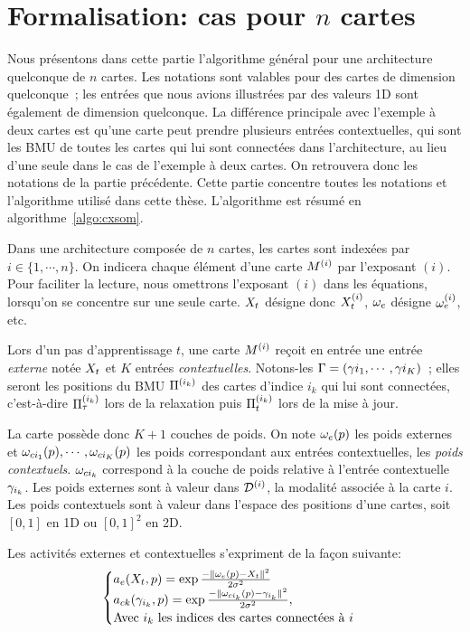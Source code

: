 \documentclass[../main]{subfiles}
\begin{document}
\section{Formalisation: cas pour $n$ cartes}\label{sec:formalisme}

Nous présentons dans cette partie l'algorithme général pour une architecture quelconque de $n$ cartes. 
Les notations sont valables pour des cartes de dimension quelconque~; les entrées que nous avions illustrées par des valeurs 1D sont également de dimension quelconque.
La différence principale avec l'exemple à deux cartes est qu'une carte peut prendre plusieurs entrées contextuelles, qui sont les BMU de toutes les cartes qui lui sont connectées dans l'architecture, au lieu d'une seule dans le cas de l'exemple à deux cartes. On retrouvera donc les notations de la partie précédente.
Cette partie concentre toutes les notations et l'algorithme utilisé dans cette thèse. 
L'algorithme est résumé en algorithme~\ref{algo:cxsom}.

Dans une architecture composée de $n$ cartes, les cartes sont indexées par $i \in \{1,\cdots,n\}$. On indicera chaque élément d'une carte $M^{({i})}$ par l'exposant $(i)$.
Pour faciliter la lecture, nous omettrons l'exposant $(i)$ dans les équations, lorsqu'on se concentre sur une seule carte. $X_t$ désigne donc $X_t^{({i})}$, $\omega_e$ désigne $\omega_e^{({i})}$, etc.

Lors d'un pas d'apprentissage $t$, une carte $M^{({i})}$ reçoit en entrée une entrée \emph{externe} notée $X_t$ et $K$ entrées \emph{contextuelles}. Notons-les $\Gamma = (\gamma{i_1},\cdots,\gamma{i_K})$~; elles seront les positions du BMU $\Pi^{({i_k})}$ des cartes d'indice $i_k$ qui lui sont connectées, c'est-à-dire $\Pi^{({i_k})}_\tau$ lors de la relaxation puis $\Pi^{({i_k})}_t$ lors de la mise à jour.

La carte possède donc $K+1$ couches de poids. On note $\omega_e(p)$ les poids externes et $\omega_{ci_1}(p), \cdots, \omega_{ci_K}(p)$ les poids correspondant aux entrées contextuelles, les \emph{poids contextuels}.
$\omega_{ci_k}$ correspond à la couche de poids relative à l'entrée contextuelle $\gamma_{i_k}$. Les poids externes sont à valeur dans $\mathcal{D}^{({i})}$, la modalité associée à la carte $i$. Les poids contextuels sont à valeur dans l'espace des positions d'une cartes, soit $[0,1]$ en 1D ou $[0,1]^2$ en 2D.

Les activités externes et contextuelles s'expriment de la façon suivante:
\begin{equation}
\label{eq:activite_general}
\begin{cases}
a_e(X_t,p) = \exp\frac{-\lVert \omega_e(p)-X_t \rVert^2}{2\sigma^2} \\
a_{ck}(\gamma_{i_k},p) = \exp\frac{-\lVert \omega_{ci_k}(p)-\gamma_{i_k} \rVert ^2}{2\sigma^2}, \\
\text{Avec $i_k$ les indices des cartes connectées à $i$}
\end{cases}
\end{equation}
\end{document}
